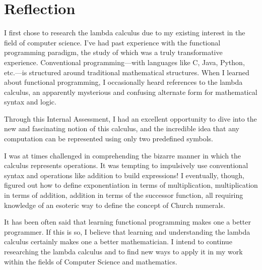 \documentclass[twocolumn,titlepage,12pt]{article}
\begin{document}
\section{Reflection}
I first chose to research the lambda calculus due to my existing interest in the field of computer science. I've had past experience with the functional programming paradigm, the study of which was a truly transformative experience. Conventional programming---with languages like C, Java, Python, etc.---is structured around traditional mathematical structures. When I learned about functional programming, I occasionally heard references to the lambda calculus, an apparently mysterious and confusing alternate form for mathematical syntax and logic.

Through this Internal Assessment, I had an excellent opportunity to dive into the new and fascinating notion of this calculus, and the incredible idea that any computation can be represented using only two predefined symbols.

I was at times challenged in comprehending the bizarre manner in which the calculus represents operations. It was tempting to impulsively use conventional syntax and operations like addition to build expressions! I eventually, though, figured out how to define exponentiation in terms of multiplication, multiplication in terms of addition, addition in terms of the successor function, all requiring knowledge of an esoteric way to define the concept of Church numerals.

It has been often said that learning functional programming makes one a better programmer. If this is so, I believe that learning and understanding the lambda calculus certainly makes one a better mathematician. I intend to continue researching the lambda calculus and to find new ways to apply it in my work within the fields of Computer Science and mathematics.

\newpage


\end{document}

